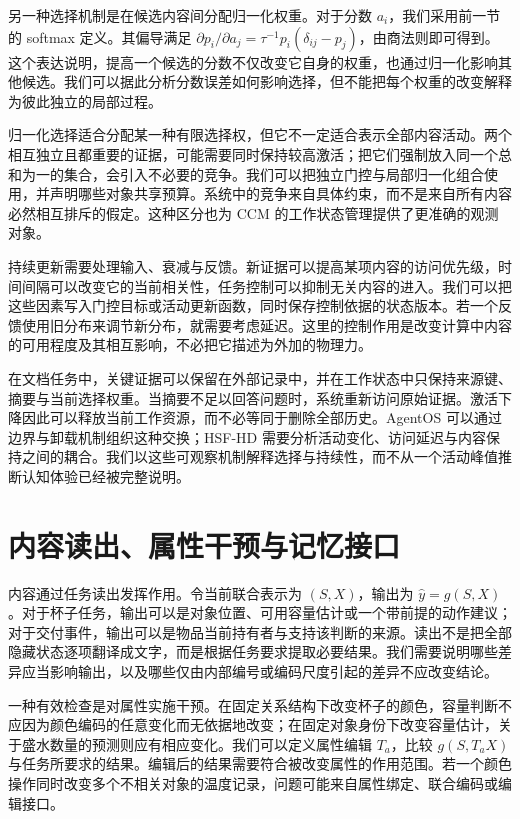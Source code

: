 另一种选择机制是在候选内容间分配归一化权重。对于分数 $a_i$，我们采用前一节的 softmax 定义。其偏导满足 $\partial p_i/\partial a_j=\tau^{-1}p_i(\delta_{ij}-p_j)$，由商法则即可得到。这个表达说明，提高一个候选的分数不仅改变它自身的权重，也通过归一化影响其他候选。我们可以据此分析分数误差如何影响选择，但不能把每个权重的改变解释为彼此独立的局部过程。

归一化选择适合分配某一种有限选择权，但它不一定适合表示全部内容活动。两个相互独立且都重要的证据，可能需要同时保持较高激活；把它们强制放入同一个总和为一的集合，会引入不必要的竞争。我们可以把独立门控与局部归一化组合使用，并声明哪些对象共享预算。系统中的竞争来自具体约束，而不是来自所有内容必然相互排斥的假定。这种区分也为 CCM 的工作状态管理提供了更准确的观测对象。

持续更新需要处理输入、衰减与反馈。新证据可以提高某项内容的访问优先级，时间间隔可以改变它的当前相关性，任务控制可以抑制无关内容的进入。我们可以把这些因素写入门控目标或活动更新函数，同时保存控制依据的状态版本。若一个反馈使用旧分布来调节新分布，就需要考虑延迟。这里的控制作用是改变计算中内容的可用程度及其相互影响，不必把它描述为外加的物理力。

在文档任务中，关键证据可以保留在外部记录中，并在工作状态中只保持来源键、摘要与当前选择权重。当摘要不足以回答问题时，系统重新访问原始证据。激活下降因此可以释放当前工作资源，而不必等同于删除全部历史。AgentOS 可以通过边界与卸载机制组织这种交换；HSF-HD 需要分析活动变化、访问延迟与内容保持之间的耦合。我们以这些可观察机制解释选择与持续性，而不从一个活动峰值推断认知体验已经被完整说明。

\section{内容读出、属性干预与记忆接口}
\label{sec:qualia_function}

内容通过任务读出发挥作用。令当前联合表示为 $(S,X)$，输出为 $\widehat y=g(S,X)$。对于杯子任务，输出可以是对象位置、可用容量估计或一个带前提的动作建议；对于交付事件，输出可以是物品当前持有者与支持该判断的来源。读出不是把全部隐藏状态逐项翻译成文字，而是根据任务要求提取必要结果。我们需要说明哪些差异应当影响输出，以及哪些仅由内部编号或编码尺度引起的差异不应改变结论。

一种有效检查是对属性实施干预。在固定关系结构下改变杯子的颜色，容量判断不应因为颜色编码的任意变化而无依据地改变；在固定对象身份下改变容量估计，关于盛水数量的预测则应有相应变化。我们可以定义属性编辑 $T_a$，比较 $g(S,T_aX)$ 与任务所要求的结果。编辑后的结果需要符合被改变属性的作用范围。若一个颜色操作同时改变多个不相关对象的温度记录，问题可能来自属性绑定、联合编码或编辑接口。

